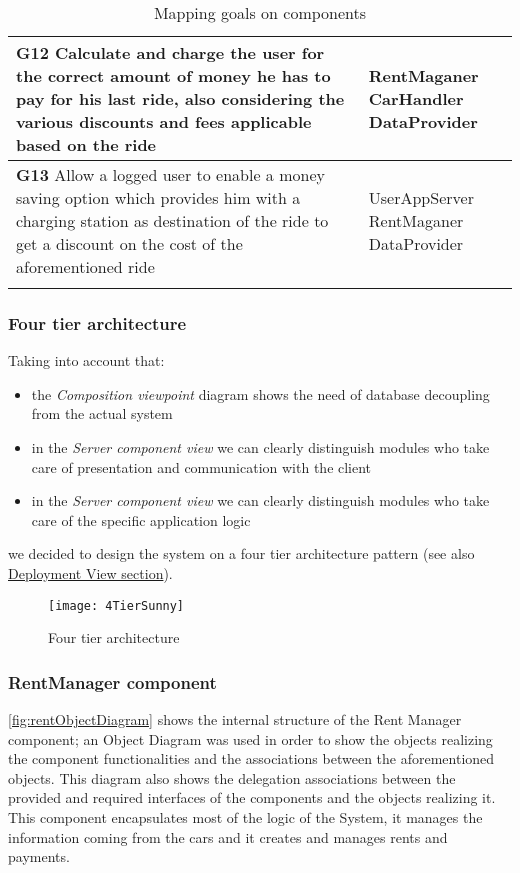 \begin{longtable}{p{0.7\linewidth}p{0.3\linewidth}}
\midrule
\textbf{G12} Calculate and charge the user for the correct amount of money he has to pay for his last ride, also considering the various discounts and fees applicable based on the ride & \mbox{RentMaganer} \mbox{CarHandler} \mbox{DataProvider}\\
\midrule
\textbf{G13} Allow a logged user to enable a money saving option which provides him with a charging station as destination of the ride to get a discount on the cost of the aforementioned ride & \mbox{UserAppServer} \mbox{RentMaganer} \mbox{DataProvider}\\
\midrule
\bottomrule
\caption{\label{tbl:mappingGoalsOnComponent}Mapping goals on components}
\end{longtable}

\clearpage
\subsubsection{Four tier architecture}
Taking into account that:
\begin{itemize}
	\item the \emph{Composition viewpoint} diagram shows the need of database decoupling from the actual system
	\item in the \emph{Server component view} we can clearly distinguish modules who take care of presentation and communication with the client
	\item in the \emph{Server component view} we can clearly distinguish modules who take care of the specific application logic
\end{itemize}
we decided to design the system on a four tier architecture pattern (see also \hyperref[sec:deploymentView]{Deployment View section}). 
\begin{figure}[h]
	\centering
	\texttt{[image: 4TierSunny]}
	\caption{
		\label{fig:fourTier} 
		Four tier architecture
	}
\end{figure}

\clearpage
\subsubsection{RentManager component}

\autoref{fig:rentObjectDiagram} shows the internal structure of the Rent Manager component; an \mbox{Object} \mbox{Diagram} was used in order to show the objects realizing the component functionalities and the associations between the aforementioned objects. This diagram also shows the delegation associations between the provided and required interfaces of the components and the objects realizing it.
\\
This component encapsulates most of the logic of the System, it manages the information coming from the cars and it creates and manages rents and payments. 

